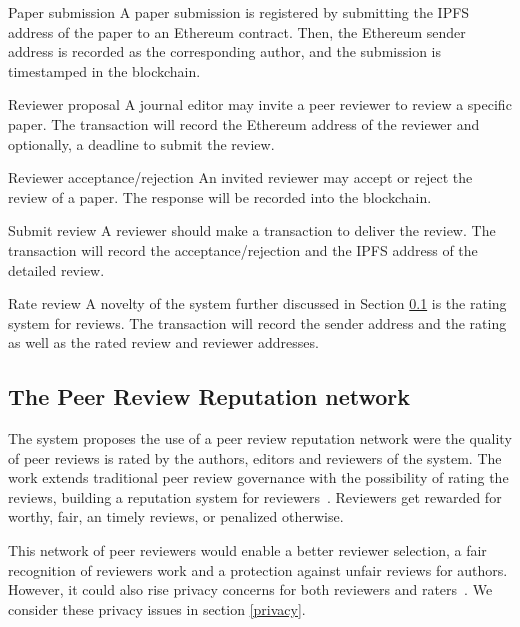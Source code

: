   \begin{LaTeXdescription}
  \item[Paper submission] A paper submission is registered by submitting the
    IPFS address of the paper to an Ethereum contract. Then, the Ethereum sender
    address is recorded as the corresponding author, and the submission is
    timestamped in the blockchain.

  \item[Reviewer proposal] A journal editor may invite a peer reviewer to review
    a specific paper. The transaction will record the Ethereum address of the
    reviewer and optionally, a deadline to submit the review.

  \item[Reviewer acceptance/rejection] An invited reviewer may accept or reject
    the review of a paper. The response will be recorded into the blockchain.

  \item[Submit review] A reviewer should make a transaction to deliver the
    review. The transaction will record the acceptance/rejection and the IPFS
    address of the detailed review.

  \item[Rate review] A novelty of the system further discussed in Section
    \ref{reputation} is the rating system for reviews. The transaction will
    record the sender address and the rating as well as the rated review and
    reviewer addresses.
  \end{LaTeXdescription}

  \subsection{The Peer Review Reputation network}
  \label{reputation}

  The system proposes the use of a peer review reputation network were the
  quality of peer reviews is rated by the authors, editors and reviewers of the
  system. The work extends traditional peer review governance with the
  possibility of rating the reviews, building a reputation system for
  reviewers~\cite{resnick2000reputation}. Reviewers get rewarded for worthy,
  fair, an timely reviews, or penalized otherwise.

  This network of peer reviewers would enable a better reviewer selection, a
  fair recognition of reviewers work and a protection against unfair reviews for
  authors. However, it could also rise privacy concerns for both reviewers and
  raters~\cite{van1999effect,schaub2016trustless}. We consider these privacy
  issues in section \ref{privacy}.

